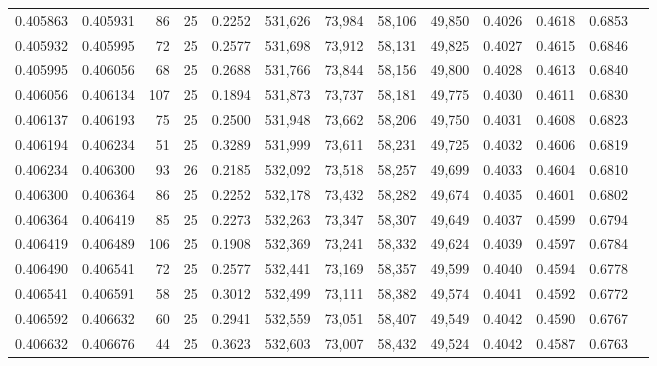 \begin{tabular}{rrrrrrrrrrrrr}
0.405863 & 0.405931 &    86 &  25 &                                     0.2252 & 531,626 &  73,984 &  58,106 &  49,850 & 0.4026 & 0.4618 & 0.6853 \\
0.405932 & 0.405995 &    72 &  25 &                                     0.2577 & 531,698 &  73,912 &  58,131 &  49,825 & 0.4027 & 0.4615 & 0.6846 \\
0.405995 & 0.406056 &    68 &  25 &                                     0.2688 & 531,766 &  73,844 &  58,156 &  49,800 & 0.4028 & 0.4613 & 0.6840 \\
0.406056 & 0.406134 &   107 &  25 &                                     0.1894 & 531,873 &  73,737 &  58,181 &  49,775 & 0.4030 & 0.4611 & 0.6830 \\
0.406137 & 0.406193 &    75 &  25 &                                     0.2500 & 531,948 &  73,662 &  58,206 &  49,750 & 0.4031 & 0.4608 & 0.6823 \\
0.406194 & 0.406234 &    51 &  25 &                                     0.3289 & 531,999 &  73,611 &  58,231 &  49,725 & 0.4032 & 0.4606 & 0.6819 \\
0.406234 & 0.406300 &    93 &  26 &                                     0.2185 & 532,092 &  73,518 &  58,257 &  49,699 & 0.4033 & 0.4604 & 0.6810 \\
0.406300 & 0.406364 &    86 &  25 &                                     0.2252 & 532,178 &  73,432 &  58,282 &  49,674 & 0.4035 & 0.4601 & 0.6802 \\
0.406364 & 0.406419 &    85 &  25 &                                     0.2273 & 532,263 &  73,347 &  58,307 &  49,649 & 0.4037 & 0.4599 & 0.6794 \\
0.406419 & 0.406489 &   106 &  25 &                                     0.1908 & 532,369 &  73,241 &  58,332 &  49,624 & 0.4039 & 0.4597 & 0.6784 \\
0.406490 & 0.406541 &    72 &  25 &                                     0.2577 & 532,441 &  73,169 &  58,357 &  49,599 & 0.4040 & 0.4594 & 0.6778 \\
0.406541 & 0.406591 &    58 &  25 &                                     0.3012 & 532,499 &  73,111 &  58,382 &  49,574 & 0.4041 & 0.4592 & 0.6772 \\
0.406592 & 0.406632 &    60 &  25 &                                     0.2941 & 532,559 &  73,051 &  58,407 &  49,549 & 0.4042 & 0.4590 & 0.6767 \\
0.406632 & 0.406676 &    44 &  25 &                                     0.3623 & 532,603 &  73,007 &  58,432 &  49,524 & 0.4042 & 0.4587 & 0.6763 \\

\end{tabular}
